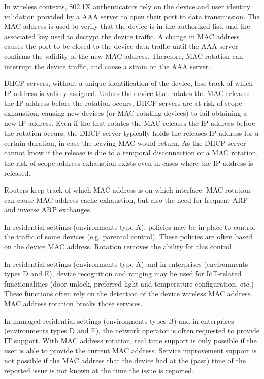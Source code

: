 \documentclass[10pt]{article}
\begin{document}
{In wireless contexts, 802.1X authenticators rely on the device and user identity validation provided by a AAA server to open their port to data transmission. The MAC address is used to verify that the device is in the authorized list, and the associated key used to decrypt the device traffic. A change in MAC address causes the port to be closed to the device data traffic until the AAA server confirms the validity of the new MAC address. Therefore, MAC rotation can interrupt the device traffic, and cause a strain on the AAA server.

DHCP servers, without a unique identification of the device, lose track of which IP address is validly assigned. Unless the device that rotates the MAC releases the IP address before the rotation occurs, DHCP servers are at risk of scope exhaustion, causing new devices (or MAC rotating devices) to fail obtaining a new IP address. Even if the that rotates the MAC releases the IP address before the rotation occurs, the DHCP server typically holds the releases IP address for a certain duration, in case the leaving MAC would return. As the DHCP server cannot know if the release is due to a temporal disconnection or a MAC rotation, the risk of scope address exhaustion exists even in cases where the IP address is released.

Routers keep track of which MAC address is on which interface. MAC rotation can cause MAC address cache exhaustion, but also the need for frequent ARP and inverse ARP exchanges.

In residential settings (environments type A), policies may be in place to control the traffic of some devices (e.g. parental control). These policies are often based on the device MAC address. Rotation removes the ability for this control.

In residential settings (environments type A) and in enterprises (environments types D and E), device recognition and ranging may be used for IoT-related functionalities (door unlock, preferred light and temperature configuration, etc.) These functions often rely on the detection of the device wireless MAC address. MAC address rotation breaks those services.

In managed residential settings (environments types B) and in enterprises (environments types D and E), the network operator is often requested to provide IT support. With MAC address rotation, real time support is only possible if the user is able to provide the current MAC address. Service improvement support is not possible if the MAC address that the device had at the (past) time of the reported issue is not known at the time the issue is reported.

}
\end{document}
